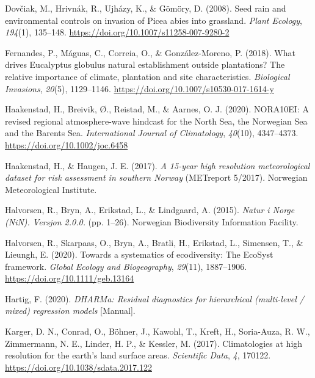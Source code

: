 \documentclass[
]{article}
\begin{document}
\leavevmode\hypertarget{ref-dovciakSeedRainEnvironmental2008}{}%
Dovčiak, M., Hrivnák, R., Ujházy, K., \& Gömöry, D. (2008). Seed rain and environmental controls on invasion of Picea abies into grassland. \emph{Plant Ecology}, \emph{194}(1), 135--148. \url{https://doi.org/10.1007/s11258-007-9280-2}

\leavevmode\hypertarget{ref-fernandesWhatDrivesEucalyptus2018}{}%
Fernandes, P., Máguas, C., Correia, O., \& González-Moreno, P. (2018). What drives Eucalyptus globulus natural establishment outside plantations? The relative importance of climate, plantation and site characteristics. \emph{Biological Invasions}, \emph{20}(5), 1129--1146. \url{https://doi.org/10.1007/s10530-017-1614-y}

\leavevmode\hypertarget{ref-haakenstadNORA10EIRevisedRegional2020}{}%
Haakenstad, H., Breivik, Ø., Reistad, M., \& Aarnes, O. J. (2020). NORA10EI: A revised regional atmosphere-wave hindcast for the North Sea, the Norwegian Sea and the Barents Sea. \emph{International Journal of Climatology}, \emph{40}(10), 4347--4373. \url{https://doi.org/10.1002/joc.6458}

\leavevmode\hypertarget{ref-haakenstad15yearHighResolution2017}{}%
Haakenstad, H., \& Haugen, J. E. (2017). \emph{A 15-year high resolution meteorological dataset for risk assessment in southern Norway} (METreport 5/2017). Norwegian Meteorological Institute.

\leavevmode\hypertarget{ref-halvorsenNaturNorgeNiN2015}{}%
Halvorsen, R., Bryn, A., Erikstad, L., \& Lindgaard, A. (2015). \emph{Natur i Norge (NiN). Versjon 2.0.0.} (pp. 1--26). Norwegian Biodiversity Information Facility.

\leavevmode\hypertarget{ref-halvorsenSystematicsEcodiversityEcoSyst2020}{}%
Halvorsen, R., Skarpaas, O., Bryn, A., Bratli, H., Erikstad, L., Simensen, T., \& Lieungh, E. (2020). Towards a systematics of ecodiversity: The EcoSyst framework. \emph{Global Ecology and Biogeography}, \emph{29}(11), 1887--1906. \url{https://doi.org/10.1111/geb.13164}

\leavevmode\hypertarget{ref-hartigDHARMaResidualDiagnostics2020}{}%
Hartig, F. (2020). \emph{DHARMa: Residual diagnostics for hierarchical (multi-level / mixed) regression models} {[}Manual{]}.

\leavevmode\hypertarget{ref-kargerClimatologiesHighResolution2017}{}%
Karger, D. N., Conrad, O., Böhner, J., Kawohl, T., Kreft, H., Soria-Auza, R. W., Zimmermann, N. E., Linder, H. P., \& Kessler, M. (2017). Climatologies at high resolution for the earth's land surface areas. \emph{Scientific Data}, \emph{4}, 170122. \url{https://doi.org/10.1038/sdata.2017.122}
\end{document}

